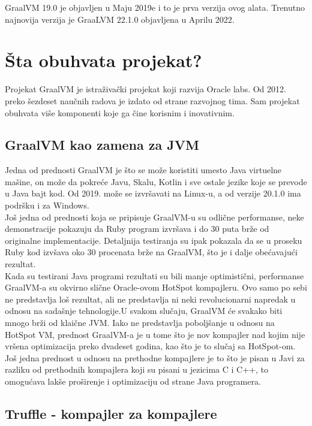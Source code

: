 \documentclass[a4paper]{article}
\begin{document}
GraalVM 19.0 je objavljen u Maju 2019e i to je prva verzija ovog alata. Trenutno najnovija verzija je GraaLVM 22.1.0 objavljena u Aprilu 2022. 

\section{Šta obuhvata projekat?}
\label{sec:Šta obuhvata projekat?}

Projekat GraalVM je istraživački projekat koji razvija Oracle labs. Od 2012. preko šezdeset naučnih radova je izdato od strane razvojnog tima. Sam projekat obuhvata više komponenti koje ga čine korisnim i inovativnim.

\subsection{GraalVM kao zamena za JVM}
\label{sub:GraalVM kao zamena za JVM}

Jedna od prednosti GraalVM je što se može koristiti umesto Java virtuelne mašine, on može da pokreće Javu, Skalu, Kotlin i sve ostale jezike koje se prevode u Java bajt kod. Od 2019. može se izvršavati na Linux-u, a od verzije 20.1.0 ima podršku i za Windows. \\

Još jedna od prednosti koja se pripisuje GraalVM-u su odlične performanse, neke demonstracije pokazuju da Ruby program izvršava i do 30 puta brže od originalne implementacije.
Detaljnija testiranja su ipak pokazala da se u proseku Ruby kod izvšava oko 30 procenata brže na GraalVM, što je i dalje obećavajući rezultat. \\

Kada su testirani Java programi rezultati su bili manje optimistični, performanse GraalVM-a su okvirno slične Oracle-ovom HotSpot kompajleru. Ovo samo po sebi ne predstavlja loš rezultat, ali ne predstavlja ni neki revolucionarni napredak u odnosu na sadašnje tehnologije.U svakom slučaju, GraalVM će svakako biti mnogo brži od klaične JVM. Iako ne predstavlja poboljšanje u odnosu na HotSpot VM, prednost GraalVM-a je u tome što je nov kompajler nad kojim nije vršena optimizacija preko dvadeset godina, kao što je to slučaj sa HotSpot-om. Još jedna prednost u odnosu na prethodne kompajlere je to što je pisan u Javi za razliku od prethodnih kompajlera koji su pisani u jezicima C i C++, to omogućava lakše proširenje i optimizaciju od strane Java programera.

\subsection{Truffle - kompajler za kompajlere}
\label{Truffle - kompajler za kompajlere}
\end{document}
